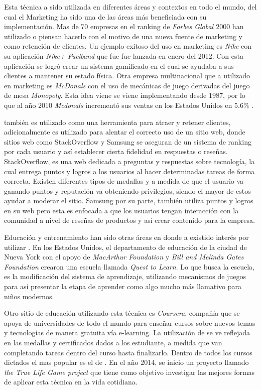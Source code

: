 Esta técnica a sido utilizada en diferentes áreas y contextos en todo el mundo,
del cual el Marketing ha sido una de las áreas más beneficiada con su
implementación.
Mas de 70 empresas en el ranking de \emph{Forbes Global $2000$} han utilizado o
piensan hacerlo con el motivo de una nueva fuente de marketing y como retención
de clientes\cite{Gam:Util:1}.
Un ejemplo exitoso del uso en marketing es \emph{Nike} con su aplicación
\emph{Nike+ Fuelband} que fue fue lanzada en enero del 2012\cite{Gam:Util:2}.
Con esta aplicación se logró crear un sistema gamificado en el cual se ayudaba
a sus clientes a mantener su estado física.
Otra empresa multinacional que a utilizado {\GAM} en marketing es \emph{McDonals}
con el uso de mecánicas de juego derivadas del juego de mesa \emph{Monopoly}.
Esta idea viene se viene implementando desde $1987$, por lo que al año $2010$
\emph{Mcdonals} incrementó sus ventas en los Estados Unidos en $5.6\%$
\cite{Gam:Util:2}.

{\GAM} también es utilizado como una herramienta para atraer y retener clientes,
adicionalmente es utilizado para alentar el correcto uso de un sitio web,
donde sitios web como StackOverflow y Samsung se aseguran de un sistema
de ranking por cada usuario y así establecer cierta fidelidad en respuestas
o reseñas.
StackOverflow, es una web dedicada a preguntas y respuestas sobre tecnología,
la cual entrega puntos  y logros a los usuarios al hacer determinadas tareas
de forma correcta.
Existen diferentes tipos de medallas y a medida  de que el usuario va ganando
puntos y reputación va obteniendo privilegios, siendo el mayor de estos ayudar a
moderar el sitio.
Samsung por su parte, también utiliza puntos y logros en su web pero esta
es enfocada a que los usuarios tengan interacción con la comunidad a nivel de
reseñas de productos y así crear contenido para la empresa\cite{Gam:Util:3}.

Educación y entrenamiento han sido otras áreas en donde a existido interés por
utilizar {\GAM}.
En los Estados Unidos, el departamento de educación de la ciudad de Nueva York
con el apoyo de \emph{MacArthur Foundation} y \emph{Bill and Melinda Gates
Foundation} crearon una escuela  llamada \emph{Quest to Learn}.
Lo que busca la escuela, es la modificación del sistema de aprendizaje,
utilizando mecanismos de juegos para así presentar la etapa de aprender
como algo mucho más llamativo para niños modernos\cite{Gam:Util:4}.

Otro sitio de educación utilizando esta técnica es \emph{Coursera},
compañía que se apoya de universidades de todo el mundo para enseñar
cursos sobre nuevos temas y tecnologías de manera gratuita vía e-learning.
La utilización de {\GAM} se ve reflejada en las medallas y certificados dados
a los estudiante, a medida que van completando tareas dentro del curso
hasta finalizarlo.
Dentro de todos los cursos dictados el mas popular es el de {\GAM}\cite{Gam:Util:5}.
En el año 2014, se inicio un proyecto llamado \emph{the True Life Game project}
que tiene como objetivo investigar las mejores formas de aplicar esta técnica en
la vida cotidiana.

